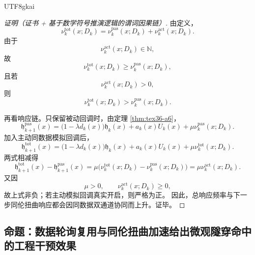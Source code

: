 \documentclass[12pt]{article}
\newcommand{\NN}{\mathbb{N}}
\begin{document}
\begin{CJK*}{UTF8}{gkai}
\begin{proof}[证明（证书 + 基于数学符号推演逻辑的谓词因果链）]
由定义，
\[
  \nu_k^{\mathrm{tot}}(x;D_k)
  =
  \nu_k^{\mathrm{pas}}(x;D_k)
  +
  \nu_k^{\mathrm{act}}(x;D_k).
\]
由于
\[
  \nu_k^{\mathrm{act}}(x;D_k)\in\NN,
\]
故
\[
  \nu_k^{\mathrm{tot}}(x;D_k)\ge \nu_k^{\mathrm{pas}}(x;D_k),
\]
且若
\[
  \nu_k^{\mathrm{act}}(x;D_k)>0,
\]
则
\[
  \nu_k^{\mathrm{tot}}(x;D_k)> \nu_k^{\mathrm{pas}}(x;D_k).
\]

再看响应链。只保留被动回调时，由定理 \ref{thm:tex36-a6}，
\[
  \mathfrak h_{k+1}^{\mathrm{pas}}(x)
  =
  \bigl(1-\lambda d_k(x)\bigr)\mathfrak h_k(x)
  +
  a_k(x)U_k(x)
  +
  \mu \nu_k^{\mathrm{pas}}(x;D_k).
\]
加入主动同数据模拟回调后，
\[
  \mathfrak h_{k+1}^{\mathrm{tot}}(x)
  =
  \bigl(1-\lambda d_k(x)\bigr)\mathfrak h_k(x)
  +
  a_k(x)U_k(x)
  +
  \mu \nu_k^{\mathrm{tot}}(x;D_k).
\]
两式相减得
\[
  \mathfrak h_{k+1}^{\mathrm{tot}}(x)
  -
  \mathfrak h_{k+1}^{\mathrm{pas}}(x)
  =
  \mu\bigl(
    \nu_k^{\mathrm{tot}}(x;D_k)
    -
    \nu_k^{\mathrm{pas}}(x;D_k)
  \bigr)
  =
  \mu \nu_k^{\mathrm{act}}(x;D_k).
\]
又因
\[
  \mu>0,
  \qquad
  \nu_k^{\mathrm{act}}(x;D_k)\ge 0,
\]
故上式非负；若主动模拟回调真实开启，则严格为正。
因此，总响应频率与下一步同伦扭曲响应都会因同数据双通道协同而上升。证毕。
\end{proof}

\subsection{命题：数据轮询复用与同伦扭曲加速给出微观隧穿命中的工程干预效果}
\label{subsec:tex36-deterministic-tunneling-gain}


\end{CJK*}
\end{document}
